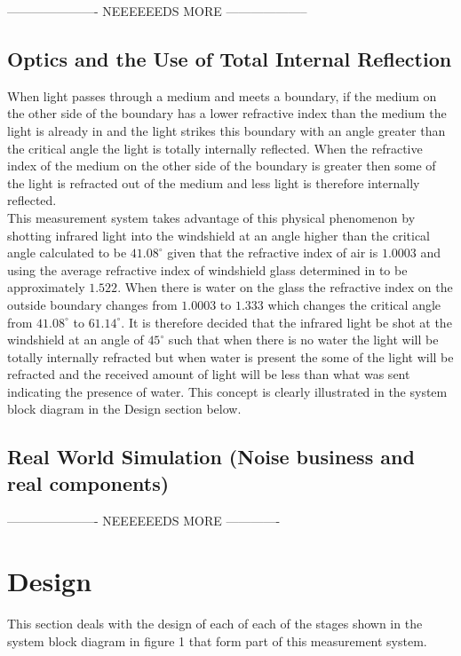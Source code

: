 \documentclass[conference, 11pt]{IEEEtran}
\begin{document}
---------------------- NEEEEEEDS MORE --------------------
	
\subsection{Optics and the Use of Total Internal Reflection}
When light passes through a medium and meets a boundary, if the medium on the other side of the boundary has a lower refractive index than the medium the light is already in and the light strikes this boundary with an angle greater than the critical angle the light is totally internally reflected. When the refractive index of the medium on the other side of the boundary is greater then some of the light is refracted out of the medium and less light is therefore internally reflected. \\

This measurement system takes advantage of this physical phenomenon by shotting infrared light into the windshield at an angle higher than the critical angle calculated to be $41.08 ^{\circ}$ given that the refractive index of air is $1.0003$ and using the average refractive index of windshield glass determined in \cite{RI} to be approximately $1.522$. When there is water on the glass the refractive index on the outside boundary changes from $1.0003$ to $1.333$ which changes the critical angle from $41.08 ^{\circ}$ to $61.14 ^{\circ}$. It is therefore decided that the infrared light be shot at the windshield at an angle of $45 ^{\circ}$ such that when there is no water the light will be totally internally refracted but when water is present the some of the light will be refracted and the received amount of light will be less than what was sent indicating the presence of water. This concept is clearly illustrated in the system block diagram in the Design section below. 

	
\subsection{Real World Simulation (Noise business and real components)}

---------------------- NEEEEEEDS MORE -------------
\cite{NOISE}
	
\section{Design}
This section deals with the design of each of each of the stages shown in the system block diagram in figure 1 that form part of this measurement system. 
\end{document}
